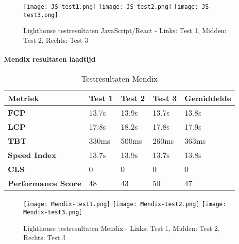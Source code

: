\begin{figure}[htbp]
    \centering
    \texttt{[image: JS-test1.png]}
    \hfill
    \texttt{[image: JS-test2.png]}
    \hfill
    \texttt{[image: JS-test3.png]}
    \caption{Lighthouse testresultaten JavaScript/React - Links: Test 1, Midden: Test 2, Rechts: Test 3}
    \label{fig:javascript-simple}
\end{figure}

\newpage
\paragraph{Mendix resultaten laadtijd}

\begin{table}[h]
    \centering
    \begin{tabular}{ |p{3cm}|p{2.75cm}|p{2.75cm}|p{2.75cm}|p{2.75cm}|}
        \hline
        \textbf{Metriek} & \textbf{Test 1} & \textbf{Test 2}  & \textbf{Test 3} & \textbf{Gemiddelde}\\
        \hline
        \textbf{\gls{FCP}}  & 13.7s & 13.9s & 13.7s & 13.8s \\
        \hline
        \textbf{\gls{LCP}} & 17.8s & 18.2s & 17.8s & 17.9s\\
        \hline
        \textbf{\gls{TBT}}  & 330ms & 500ms & 260ms & 363ms \\
        \hline
        \textbf{Speed Index}  & 13.7s & 13.9s & 13.7s & 13.8s \\
        \hline
        \textbf{\gls{CLS}}  & 0 & 0  & 0 & 0 \\
        \hline
        \textbf{Performance Score}  & 48 & 43  & 50 & 47 \\
        \hline
    \end{tabular}
    \caption[\centering Testresultaten laadtijd Mendix]{\label{tab:Testresultaten Mendix}Testresultaten Mendix}
\end{table}

\begin{figure}[htbp]
    \centering
    \texttt{[image: Mendix-test1.png]}
    \hfill
    \texttt{[image: Mendix-test2.png]}
    \hfill
    \texttt{[image: Mendix-test3.png]}
    \caption{Lighthouse testresultaten Mendix - Links: Test 1, Midden: Test 2, Rechts: Test 3}
    \label{fig:mendix-simple}
\end{figure}
\newpage
